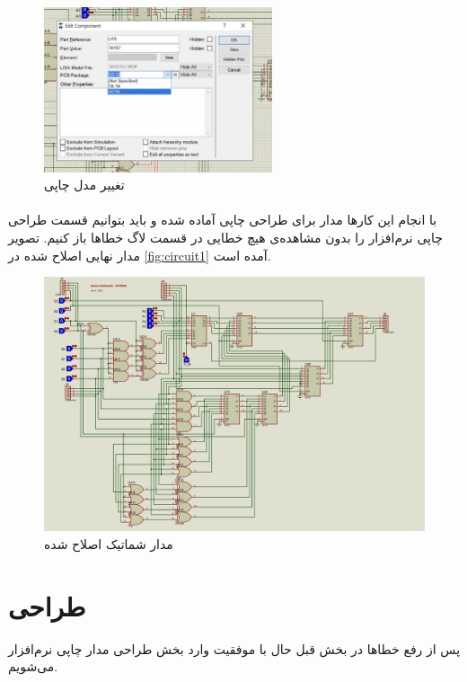 \begin{figure}[h!]
    \centering
    \includegraphics[width=0.6\textwidth]{images/ALU-PCB-Model.png}
    \caption{
    تغییر مدل چاپی
    }
    \label{fig:prot1}
\end{figure}

\paragraph{}
با انجام این کارها مدار برای طراحی چاپی آماده شده و باید بتوانیم قسمت طراحی چاپی نرم‌افزار را بدون
مشاهده‌ی هیچ خطایی در قسمت لاگ خطاها باز کنیم.
تصویر مدار نهایی اصلاح شده در
\eqref{fig:circuit1}
آمده است.

\begin{figure}[h!]
    \centering
    \includegraphics[width=\textwidth]{images/ALU-PCB.png}
    \caption{
    مدار شماتیک اصلاح شده
    }
    \label{fig:circuit1}
\end{figure}

\newpage

\section{
طراحی
}
پس از رفع خطاها در بخش قبل حال با موفقیت وارد بخش طراحی مدار چاپی نرم‌افزار می‌شویم.

